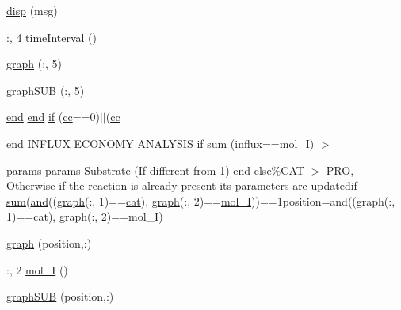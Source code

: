 \begin{DoxyCompactItemize}
\item 
\hyperlink{a00028_a107ac08fa413d7d0c5323dc4330d83fb}{disp} (msg)
\item 
\+:, 4 \hyperlink{a00028_a430673c9821c17e4bf93cd42f59e00bb}{time\+Interval} ()
\item 
\hyperlink{a00028_a06db733746591db2e7af550e39737769}{graph} (\+:, 5)
\item 
\hyperlink{a00028_a0dcc86024488689bb64656babb50789c}{graph\+S\+U\+B} (\+:, 5)
\item 
\hyperlink{a00025_afb358f48b1646c750fb9da6c6585be2b}{end} \hyperlink{a00025_afb358f48b1646c750fb9da6c6585be2b}{end} \hyperlink{a00028_a69389e83631699e80408490e48a695b0}{if} (\hyperlink{a00028_afb5980388a6e55ca55437b53cdaf528a}{cc}==0)$\vert$$\vert$(\hyperlink{a00028_afb5980388a6e55ca55437b53cdaf528a}{cc}
\item 
\hyperlink{a00025_afb358f48b1646c750fb9da6c6585be2b}{end} I\+N\+F\+L\+U\+X E\+C\+O\+N\+O\+M\+Y A\+N\+A\+L\+Y\+S\+I\+S \hyperlink{a00030_a01d55766b8058903dd360b4bda71f9f5}{if} \hyperlink{a00028_a576bebae86b11914280920c448def53d}{sum} (\hyperlink{a00107_a902e747aeec6b345d3a057099152f41f}{influx}==\hyperlink{a00028_ab346189eef5359a07ba32144ddcd4465}{mol\+\_\+\+I}) $>$
\item 
params params \hyperlink{a00028_a933446706261d8afb3d9cb88a769aa2b}{Substrate} (If different \hyperlink{a00028_aa7b4fe13e75a69fca72862effeaf6196}{from} 1) \hyperlink{a00025_afb358f48b1646c750fb9da6c6585be2b}{end} \hyperlink{a00031_af5946383720aa572eb93e1e63afc23c2}{else}\%C\+A\+T-\/$>$ P\+R\+O, Otherwise \hyperlink{a00030_a01d55766b8058903dd360b4bda71f9f5}{if} the \hyperlink{a00028_a4ba2ecb46f808729569ecce2cc1d34c6}{reaction} is already present its parameters are updatedif \hyperlink{a00106_a59a869fb2b28d56dacd91c09e1dffc8d}{sum}(\hyperlink{a00028_a170f8acb213f91bf71c77b1d20bceb33}{and}((\hyperlink{a00028_a2745e24fec2a44d51f4452beb1596bd3}{graph}(\+:, 1)==\hyperlink{a00028_a7073f71a43389f3032e69b1fffc2551a}{cat}), \hyperlink{a00028_a2745e24fec2a44d51f4452beb1596bd3}{graph}(\+:, 2)==\hyperlink{a00028_ab346189eef5359a07ba32144ddcd4465}{mol\+\_\+\+I}))==1position=and((graph(\+:, 1)==cat), graph(\+:, 2)==mol\+\_\+\+I)
\item 
\hyperlink{a00028_a2745e24fec2a44d51f4452beb1596bd3}{graph} (position,\+:)
\item 
\+:, 2 \hyperlink{a00028_ab346189eef5359a07ba32144ddcd4465}{mol\+\_\+\+I} ()
\item 
\hyperlink{a00028_acd499d32ebba9c935bab9a19da7a174b}{graph\+S\+U\+B} (position,\+:)
\item 
$$
\end{DoxyCompactItemize}
